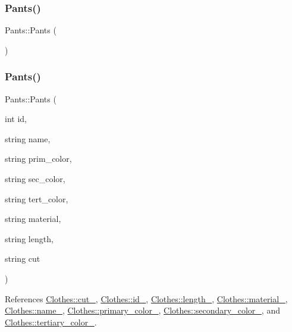 \subsubsection{\texorpdfstring{Pants()}{Pants()}\hspace{0.1cm}{\footnotesize\ttfamily [1/2]}}
{\footnotesize\ttfamily Pants\+::\+Pants (\begin{DoxyParamCaption}{ }\end{DoxyParamCaption})}

\mbox{\label{classPants_a9ca6f6ddce0ac46556b6e56a9d73ddd0}} 
\subsubsection{\texorpdfstring{Pants()}{Pants()}\hspace{0.1cm}{\footnotesize\ttfamily [2/2]}}
{\footnotesize\ttfamily Pants\+::\+Pants (\begin{DoxyParamCaption}\item[{int}]{id,  }\item[{string}]{name,  }\item[{string}]{prim\+\_\+color,  }\item[{string}]{sec\+\_\+color,  }\item[{string}]{tert\+\_\+color,  }\item[{string}]{material,  }\item[{string}]{length,  }\item[{string}]{cut }\end{DoxyParamCaption})}



References \mbox{\hyperlink{classClothes_ac1c2286c8928a5eee91d818a098a44ac}{Clothes\+::cut\+\_\+}}, \mbox{\hyperlink{classClothes_a8978d931db5ca47c3ccea30def4ae83e}{Clothes\+::id\+\_\+}}, \mbox{\hyperlink{classClothes_ae02603eda727e33caf46ec30e761e3c3}{Clothes\+::length\+\_\+}}, \mbox{\hyperlink{classClothes_adbb9ed311f14ccbb1e4fe0e8378a95d4}{Clothes\+::material\+\_\+}}, \mbox{\hyperlink{classClothes_a7f2275aaae24224d60c48af922c31b65}{Clothes\+::name\+\_\+}}, \mbox{\hyperlink{classClothes_a7cb005bf6cbb7f4eaa40f1b31817559c}{Clothes\+::primary\+\_\+color\+\_\+}}, \mbox{\hyperlink{classClothes_ab8f55f67b956b25d71260cffcf273673}{Clothes\+::secondary\+\_\+color\+\_\+}}, and \mbox{\hyperlink{classClothes_a3c5f1e7ab531e3ba7a38b930da8078a0}{Clothes\+::tertiary\+\_\+color\+\_\+}}.

